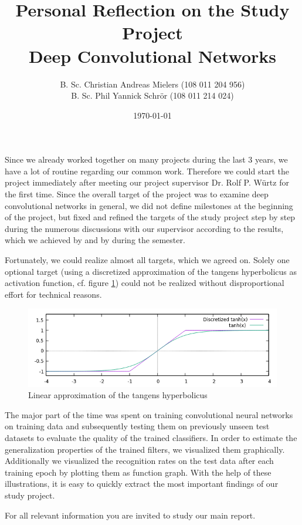 \documentclass[11pt, a4paper]{article}
\title{Personal Reflection on the Study Project\\\textbf{Deep Convolutional Networks}}
\author{B. Sc. Christian Andreas Mielers (108 011 204 956)\\ B. Sc. Phil Yannick Schrör (108 011 214 024)}
\date{\today}
\begin{document}
\maketitle

Since we already worked together on many projects during the last 3 years, we have a lot of routine regarding our common work. Therefore we could start the project immediately after meeting our project supervisor Dr. Rolf P. Würtz for the first time.  Since the overall target of the project was to examine deep convolutional networks in general, we did not define milestones at the beginning of the project, but fixed and refined the targets of the study project step by step during the numerous discussions with our supervisor according to the results, which we achieved by and by during the semester.

Fortunately, we could realize almost all targets, which we agreed on. Solely one optional target (using a discretized approximation of the tangens hyperbolicus as activation function, cf. figure \ref{fig:discretized_tanh}) could not be realized without disproportional effort for technical reasons.

\begin{figure}[h!!!]
	\centering
	\includegraphics[width=1\textwidth]{discretized_tanh.png}
	\caption{Linear approximation of the tangens hyperbolicus}
	\label{fig:discretized_tanh}
\end{figure}

The major part of the time was spent on training convolutional neural networks on training data and subsequently testing them on previously unseen test datasets to evaluate the quality of the trained classifiers. In order to estimate the generalization properties of the trained filters, we visualized them graphically. Additionally we visualized the recognition rates on the test data after each training epoch by plotting them as function graph. With the help of these illustrations, it is easy to quickly extract the most important findings of our study project.

For all relevant information you are invited to study our main report.
\end{document}

